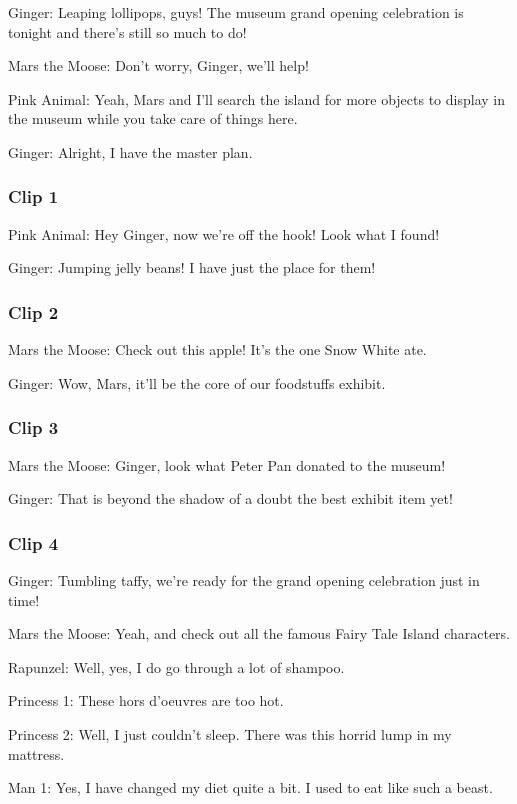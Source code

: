Ginger: Leaping lollipops, guys! The museum grand opening celebration is tonight and there's still so much to do!

Mars the Moose: Don't worry, Ginger, we'll help!

Pink Animal: Yeah, Mars and I'll search the island for more objects to display in the museum while you take care of things here.

Ginger: Alright, I have the master plan.

\subsubsection{Clip 1}

Pink Animal: Hey Ginger, now we're off the hook! Look what I found!

Ginger: Jumping jelly beans! I have just the place for them!

\subsubsection{Clip 2}

Mars the Moose: Check out this apple! It's the one Snow White ate.

Ginger: Wow, Mars, it'll be the core of our foodstuffs exhibit.

\subsubsection{Clip 3}

Mars the Moose: Ginger, look what Peter Pan donated to the museum!

Ginger: That is beyond the shadow of a doubt the best exhibit item yet!

\subsubsection{Clip 4}

Ginger: Tumbling taffy, we're ready for the grand opening celebration just in time!

Mars the Moose: Yeah, and check out all the famous Fairy Tale Island characters.

Rapunzel: Well, yes, I do go through a lot of shampoo.

Princess 1: These hors d'oeuvres are too hot.

Princess 2: Well, I just couldn't sleep. There was this horrid lump in my mattress.

Man 1: Yes, I have changed my diet quite a bit. I used to eat like such a beast.

